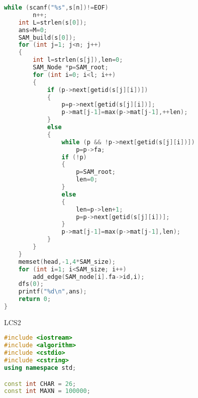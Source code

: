 \begin{lstlisting}[language=c++]
	while (scanf("%s",s[n])!=EOF)
		n++;
	int L=strlen(s[0]);
	ans=M=0;
	SAM_build(s[0]);
	for (int j=1; j<n; j++)
	{
		int l=strlen(s[j]),len=0;
		SAM_Node *p=SAM_root;
		for (int i=0; i<l; i++)
		{
			if (p->next[getid(s[j][i])])
			{
				p=p->next[getid(s[j][i])];
				p->mat[j-1]=max(p->mat[j-1],++len);
			}
			else
			{
				while (p && !p->next[getid(s[j][i])])
					p=p->fa;
				if (!p)
				{
					p=SAM_root;
					len=0;
				}
				else
				{
					len=p->len+1;
					p=p->next[getid(s[j][i])];
				}
				p->mat[j-1]=max(p->mat[j-1],len);
			}
		}
	}
	memset(head,-1,4*SAM_size);
	for (int i=1; i<SAM_size; i++)
		add_edge(SAM_node[i].fa->id,i);
	dfs(0);
	printf("%d\n",ans);
	return 0;
}
	\end{lstlisting}
	
	LCS2\\
	\begin{lstlisting}[language=c++]
#include <iostream>
#include <algorithm>
#include <cstdio>
#include <cstring>
using namespace std;

const int CHAR = 26;
const int MAXN = 100000;


\end{lstlisting}
